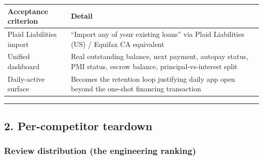 \documentclass[
  10pt,
]{article}
\begin{document}
\begin{longtable}[]{@{}ll@{}}
\toprule
\begin{minipage}[b]{0.47\columnwidth}\raggedright
Acceptance criterion\strut
\end{minipage} & \begin{minipage}[b]{0.47\columnwidth}\raggedright
Detail\strut
\end{minipage}\tabularnewline
\midrule
\endhead
\begin{minipage}[t]{0.47\columnwidth}\raggedright
Plaid Liabilities import\strut
\end{minipage} & \begin{minipage}[t]{0.47\columnwidth}\raggedright
``Import any of your existing loans'' via Plaid Liabilities (US) / Equifax CA equivalent\strut
\end{minipage}\tabularnewline
\begin{minipage}[t]{0.47\columnwidth}\raggedright
Unified dashboard\strut
\end{minipage} & \begin{minipage}[t]{0.47\columnwidth}\raggedright
Real outstanding balance, next payment, autopay status, PMI status, escrow balance,
principal-vs-interest split\strut
\end{minipage}\tabularnewline
\begin{minipage}[t]{0.47\columnwidth}\raggedright
Daily-active surface\strut
\end{minipage} & \begin{minipage}[t]{0.47\columnwidth}\raggedright
Becomes the retention loop justifying daily app open beyond the one-shot financing transaction\strut
\end{minipage}\tabularnewline
\bottomrule
\end{longtable}

\begin{center}\rule{0.5\linewidth}{0.5pt}\end{center}

\hypertarget{per-competitor-teardown}{%
\subsection{2. Per-competitor teardown}\label{per-competitor-teardown}}

\hypertarget{review-distribution-the-engineering-ranking}{%
\subsubsection{Review distribution (the engineering
ranking)}\label{review-distribution-the-engineering-ranking}}
\end{document}
